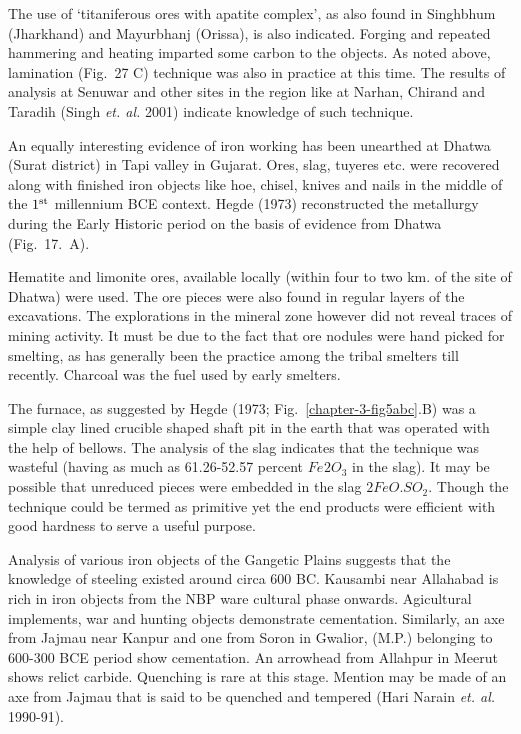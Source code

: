The use of ‘titaniferous ores with apatite complex’, as also found in Singhbhum (Jharkhand) and Mayurbhanj (Orissa), is also indicated. Forging and repeated hammering and heating imparted some carbon to the objects. As noted above, lamination (Fig.~27 C) technique was also in practice at this time. The results of analysis at Senuwar and other sites in the region like at Narhan, Chirand and Taradih (Singh {\it et. al.} 2001) indicate knowledge of such technique. 

\newpage

An equally interesting evidence of iron working has been unearthed at Dhatwa (Surat district) in Tapi valley in Gujarat. Ores, slag, tuyeres etc. were recovered along with finished iron objects like hoe, chisel, knives and nails in the middle of the $1^{\rm st}$ millennium BCE context. Hegde (1973) reconstructed the metallurgy during the Early Historic period on the basis of evidence from Dhatwa (Fig.~17.~A). 

Hematite and limonite ores, available locally (within four to two km. of the site of Dhatwa) were used. The ore pieces were also found in regular layers of the excavations. The explorations in the mineral zone however did not reveal traces of mining activity. It must be due to the fact that ore nodules were hand picked for smelting, as has generally been the practice among the tribal smelters till recently. Charcoal was the fuel used by early smelters. 

The furnace, as suggested by Hegde (1973; Fig.~\ref{chapter-3-fig5abc}.B) was a simple clay lined crucible shaped shaft pit in the earth that was operated with the help of bellows. The analysis of the slag indicates that the technique was wasteful (having as much as 61.26-52.57 percent $Fe_­­­­2O_3$ in the slag). It may be possible that unreduced pieces were embedded in the slag $2FeO. SO_2$. Though the technique could be termed as primitive yet the end products were efficient with good hardness to serve a useful purpose. 

Analysis of various iron objects of the Gangetic Plains suggests that the knowledge of steeling existed around circa 600 BC. Kausambi near Allahabad is rich in iron objects from the NBP ware cultural phase onwards. Agicultural implements, war and hunting objects demonstrate cementation. Similarly, an axe from Jajmau near Kanpur and one from Soron in Gwalior, (M.P.) belonging to 600-300 BCE period show cementation. An arrowhead from Allahpur in Meerut shows relict carbide. Quenching is rare at this stage. Mention may be made of an axe from Jajmau that is said to be quenched and tempered (Hari Narain {\it et. al.} 1990-91). 


